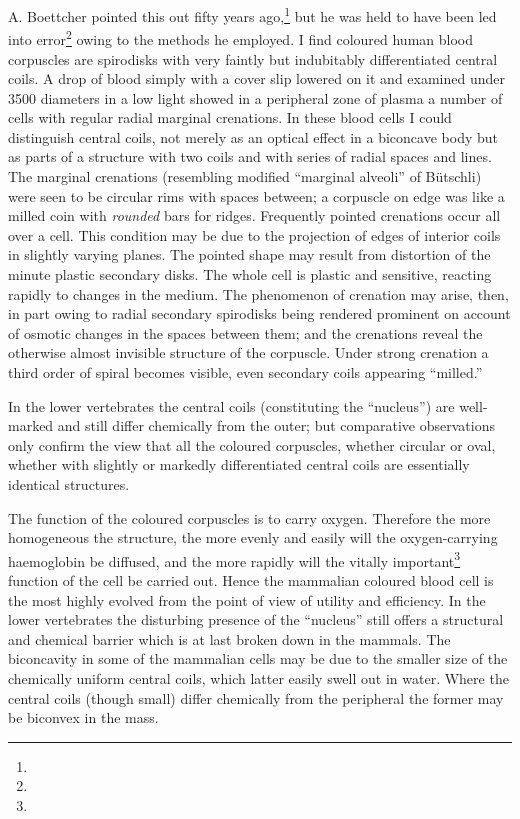 \documentclass[a4paper, 12pt, oneside]{article}
\begin{document}
A. Boettcher pointed this out fifty years ago,\footnote{} but he was held to have been led into error\footnote{} owing to the methods he employed. I find coloured human blood corpuscles are spirodisks with very faintly but indubitably differentiated central coils. A drop of blood simply with a cover slip lowered on it and examined under 3500 diameters in a low light showed in a peripheral zone of plasma a number of cells with regular radial marginal crenations. In these blood cells I could distinguish central coils, not merely as an optical effect in a biconcave body but as parts of a structure with two coils and with series of radial spaces and lines. The marginal crenations (resembling modified ``marginal alveoli'' of Bütschli) were seen to be circular rims with spaces between; a corpuscle on edge was like a milled coin with \emph{rounded} bars for ridges. Frequently pointed crenations occur all over a cell. This condition may be due to the projection of edges of interior coils in slightly varying planes. The pointed shape may result from distortion of the minute plastic secondary disks. The whole cell is plastic and sensitive, reacting rapidly to changes in the medium. The phenomenon of crenation may arise, then, in part owing to radial secondary spirodisks being rendered prominent on account of osmotic changes in the spaces between them; and the crenations reveal the otherwise almost invisible structure of the corpuscle. Under strong crenation a third order of spiral becomes visible, even secondary coils appearing ``milled.''

In the lower vertebrates the central coils (constituting the ``nucleus'') are well-marked and still differ chemically from the outer; but comparative observations only confirm the view that all the coloured corpuscles, whether circular or oval, whether with slightly or markedly differentiated central coils are essentially identical structures.

The function of the coloured corpuscles is to carry oxygen. Therefore the more homogeneous the structure, the more evenly and easily will the oxygen-carrying haemoglobin be diffused, and the more rapidly will the vitally important\footnote{} function of the cell be carried out. Hence the mammalian coloured blood cell is the most highly evolved from the point of view of utility and efficiency. In the lower vertebrates the disturbing presence of the ``nucleus'' still offers a structural and chemical barrier which is at last broken down in the mammals. The biconcavity in some of the mammalian cells may be due to the smaller size of the chemically uniform central coils, which latter easily swell out in water. Where the central coils (though small) differ chemically from the peripheral the former may be biconvex in the mass.
\end{document}
